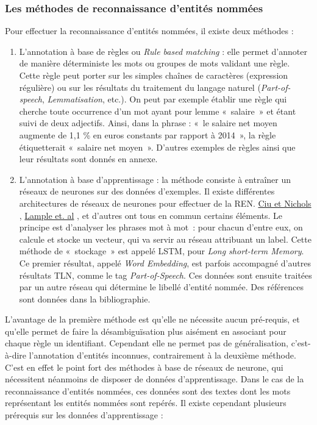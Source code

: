 \subsubsection*{Les méthodes de reconnaissance d'entités nommées}
Pour effectuer la reconnaissance d'entités nommées, il existe deux méthodes : 
\begin{enumerate}
    \item L'annotation à base de règles ou \textit{Rule based matching} : elle permet d'annoter de manière déterministe les mots ou groupes de mots validant une règle. Cette règle peut porter sur les simples chaînes de caractères (expression régulière) ou sur les résultats du traitement du langage naturel (\textit{Part-of-speech}, \textit{Lemmatisation}, etc.). On peut par exemple établir une règle qui cherche toute occurrence d'un mot ayant pour lemme «~salaire~» et étant suivi de deux adjectifs. Ainsi, dans la phrase : «~le salaire net moyen augmente de 1,1 \% en euros constants par rapport à 2014~», la règle étiquetterait «~salaire net moyen~». D'autres exemples de règles ainsi que leur résultats sont donnés en annexe.
    \vspace{5pt}
    \item L'annotation à base d'apprentissage : la méthode consiste à entraîner un réseaux de neurones sur des données d'exemples. Il existe différentes architectures de réseaux de neurones pour effectuer de la REN. \href{https://www.aclweb.org/anthology/Q16-1026}{Ciu et Nichols} \cite{chiu-nichols}, \href{https://www.aclweb.org/anthology/N16-1030}{Lample et. al} \cite{lampe-al}, et d'autres ont tous en commun certains éléments. Le principe est d'analyser les phrases mot à mot~: pour chacun d'entre eux, on calcule et stocke un vecteur, qui va servir au réseau attribuant un label. Cette méthode de «~stockage~» est appelé LSTM, pour \textit{Long short-term Memory}. Ce premier résultat, appelé \textit{Word Embedding}, est parfois accompagné d'autres résultats TLN, comme le tag \textit{Part-of-Speech}. Ces données sont ensuite traitées par un autre réseau qui détermine le libellé d'entité nommée. Des références sont données dans la bibliographie.
    \newline
\end{enumerate}

L'avantage de la première méthode est qu'elle ne nécessite aucun pré-requis, et qu'elle permet de faire la désambiguïsation plus aisément en associant pour chaque règle un identifiant. Cependant elle ne permet pas de généralisation, c'est-à-dire l'annotation d'entités inconnues, contrairement à la deuxième méthode. C'est en effet le point fort des méthodes à base de réseaux de neurone, qui nécessitent néanmoins de disposer de données d'apprentissage. Dans le cas de la reconnaissance d'entités nommées, ces données sont des textes dont les mots représentant les entités nommées sont repérés. Il existe cependant plusieurs prérequis sur les données d'apprentissage :
\newline

